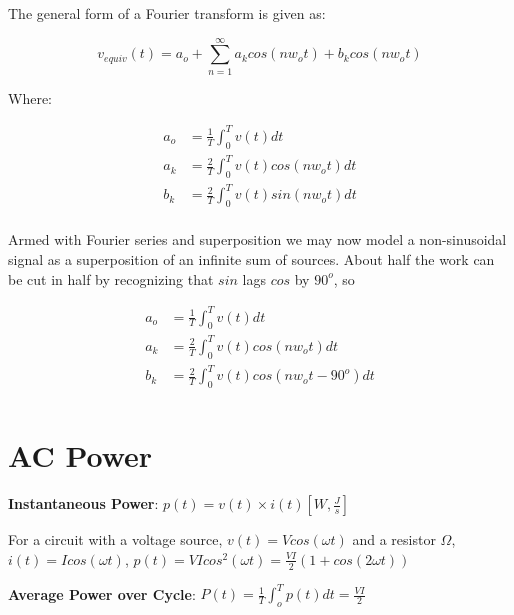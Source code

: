 \documentclass[10pt]{article}
\begin{document}
The general form of a Fourier transform is given as:

\begin{equation}
	v_{equiv}(t) = a_o + \sum^\infty_{n=1} a_k cos(nw_ot) + b_k cos(nw_ot)
	\label{eq:349:fourier}
\end{equation}

Where:

\begin{equation}
	\begin{split}
		a_o &=  \frac{1}{T} \int^T_0 v(t) dt \\
		a_k &= \frac{2}{T} \int^T_0 v(t) cos (nw_o t) dt \\
		b_k &= \frac{2}{T} \int^T_0 v(t) sin(nw_o t) dt \\
	\end{split}
	\label{eq:349:fourier_terms}
\end{equation}


Armed with Fourier series and superposition we may now model a non-sinusoidal signal as a superposition of an infinite sum of sources. About half the work can be cut in half by recognizing that $ sin $ lags $ cos $ by $ 90^o $, so


\begin{equation}
	\begin{split}
		a_o &=  \frac{1}{T} \int^T_0 v(t) dt \\
		a_k &= \frac{2}{T} \int^T_0 v(t) cos (nw_o t) dt \\
		b_k &= \frac{2}{T} \int^T_0 v(t) cos(nw_o t - 90^o) dt \\
	\end{split}
\end{equation}

\section{AC Power}

\begin{definition}
	\textbf{Instantaneous Power}: $ p(t) = v(t) \times i(t) [W, \frac{J}{s}]$  

	\begin{example}
		For a circuit with a voltage source, $ v(t) = Vcos(\omega t) $ and a resistor $ \Omega $, $ i(t) = Icos(\omega t) $, $ p(t) = VI cos^2 (\omega t) = \frac{VI}{2}(1+cos(2\omega t))$
	\end{example}
	
\end{definition}

\begin{definition}
	\textbf{Average Power over Cycle}: $ P(t) = \frac{1}{T} \int_o^T p(t) dt = \frac{VI}{2} $  
\end{definition}
\end{document}
